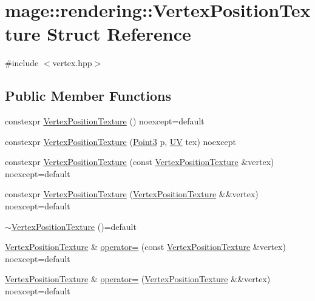 \hypertarget{structmage_1_1rendering_1_1_vertex_position_texture}{}\section{mage\+:\+:rendering\+:\+:Vertex\+Position\+Texture Struct Reference}
\label{structmage_1_1rendering_1_1_vertex_position_texture}


{\ttfamily \#include $<$vertex.\+hpp$>$}

\subsection*{Public Member Functions}
\begin{DoxyCompactItemize}
\item 
constexpr \mbox{\hyperlink{structmage_1_1rendering_1_1_vertex_position_texture_ac9f9c56c37af249a5c37145d4fed90fb}{Vertex\+Position\+Texture}} () noexcept=default
\item 
constexpr \mbox{\hyperlink{structmage_1_1rendering_1_1_vertex_position_texture_a71b7340eb44f39977a0aa11254ba5970}{Vertex\+Position\+Texture}} (\mbox{\hyperlink{structmage_1_1_point3}{Point3}} p, \mbox{\hyperlink{structmage_1_1_u_v}{UV}} tex) noexcept
\item 
constexpr \mbox{\hyperlink{structmage_1_1rendering_1_1_vertex_position_texture_a71d4ad888123a6772fabc6ad4a57ec25}{Vertex\+Position\+Texture}} (const \mbox{\hyperlink{structmage_1_1rendering_1_1_vertex_position_texture}{Vertex\+Position\+Texture}} \&vertex) noexcept=default
\item 
constexpr \mbox{\hyperlink{structmage_1_1rendering_1_1_vertex_position_texture_a8375ccf375d78d9203b130cee95982f4}{Vertex\+Position\+Texture}} (\mbox{\hyperlink{structmage_1_1rendering_1_1_vertex_position_texture}{Vertex\+Position\+Texture}} \&\&vertex) noexcept=default
\item 
\mbox{\hyperlink{structmage_1_1rendering_1_1_vertex_position_texture_afe6c0d05326d35c13f5d505065235691}{$\sim$\+Vertex\+Position\+Texture}} ()=default
\item 
\mbox{\hyperlink{structmage_1_1rendering_1_1_vertex_position_texture}{Vertex\+Position\+Texture}} \& \mbox{\hyperlink{structmage_1_1rendering_1_1_vertex_position_texture_abb25d24039e8d2f0a7d385937d5907d1}{operator=}} (const \mbox{\hyperlink{structmage_1_1rendering_1_1_vertex_position_texture}{Vertex\+Position\+Texture}} \&vertex) noexcept=default
\item 
\mbox{\hyperlink{structmage_1_1rendering_1_1_vertex_position_texture}{Vertex\+Position\+Texture}} \& \mbox{\hyperlink{structmage_1_1rendering_1_1_vertex_position_texture_abfdf8174794c7c3cbffc1843aee3aabd}{operator=}} (\mbox{\hyperlink{structmage_1_1rendering_1_1_vertex_position_texture}{Vertex\+Position\+Texture}} \&\&vertex) noexcept=default
\end{DoxyCompactItemize}
